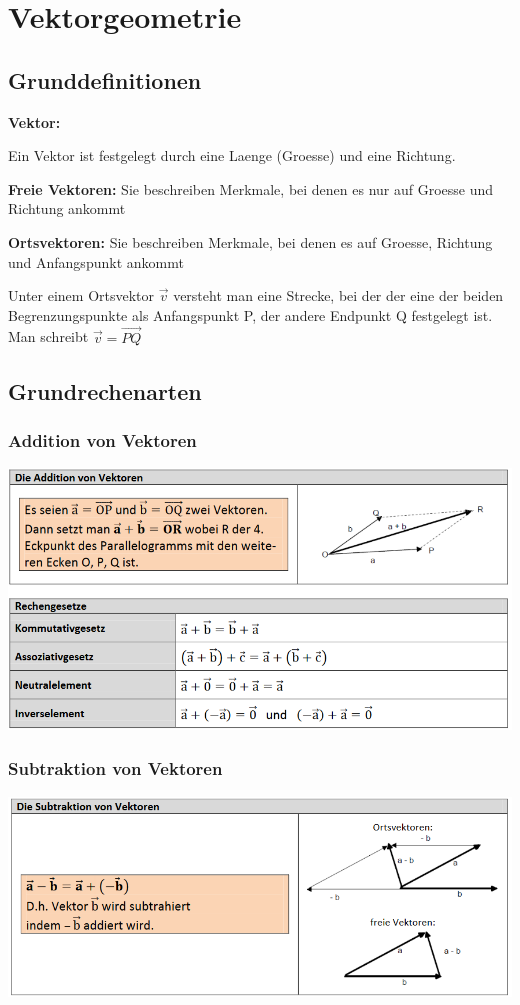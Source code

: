 \section{Vektorgeometrie}
\subsection{Grunddefinitionen}
\textbf{Vektor:}

Ein Vektor ist festgelegt durch eine Laenge (Groesse) und eine Richtung.

\textbf{Freie Vektoren: }
Sie beschreiben Merkmale,
bei denen es nur auf Groesse und Richtung ankommt

\textbf{Ortsvektoren:}
Sie beschreiben Merkmale,
bei denen es auf Groesse, Richtung und Anfangspunkt ankommt

Unter einem Ortsvektor $\vec{v}$  versteht man eine Strecke, bei der der eine der beiden Begrenzungspunkte als Anfangspunkt P, der andere Endpunkt Q festgelegt ist. Man schreibt $\vec{v} = \vec{PQ}$

\subsection{Grundrechenarten}
\subsubsection{Addition von Vektoren}
\includegraphics[scale=0.7]{vec1.PNG}
\subsubsection{Subtraktion von Vektoren}
\includegraphics[scale=0.7]{vec2.PNG}
